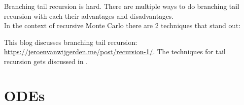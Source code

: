 \documentclass[a4paper,12pt]{article}
\begin{document}
Branching tail recursion is hard. There  are multiple ways to
do branching tail recursion with each their advantages and disadvantages. \\
In the context of recursive Monte Carlo there are $2$ techniques that
stand out:

%


\begin{related}
    This blog discusses branching tail recursion:
    \url{https://jeroenvanwijgerden.me/post/recursion-1/}.
    The techniques for tail recursion  gets discussed in \cite{vicini_path_2021}.
\end{related}


\section{ODEs}

%
%
\end{document}
